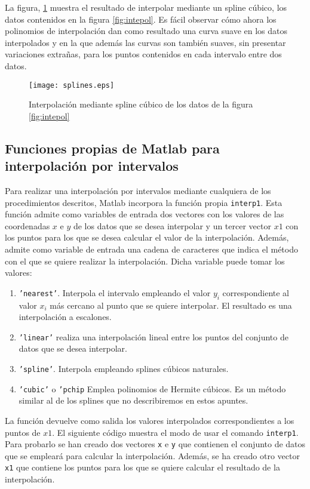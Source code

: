  La figura, \ref{fig:splines} muestra el resultado de interpolar mediante un spline cúbico, los datos contenidos en la figura \ref{fig:intepol}. Es fácil observar cómo ahora los polinomios de interpolación dan como resultado una curva suave en los datos interpolados y en la que además las curvas son también suaves, sin presentar variaciones extrañas, para los puntos contenidos en cada intervalo entre dos datos.
 
\begin{figure}[h]
\centering
\texttt{[image: splines.eps]}
\caption{Interpolación mediante spline cúbico de los datos de la figura \ref{fig:intepol}} 
\label{fig:splines}
\end{figure} 
 
 
\subsection{Funciones propias de Matlab para interpolación por intervalos} 

Para realizar una interpolación por intervalos mediante cualquiera de los procedimientos descritos, Matlab incorpora la función propia \texttt{interp1}. Esta función admite como variables de entrada dos vectores con los valores de las coordenadas $x$ e $y$ de los datos que se desea interpolar y un tercer vector $x1$ con los puntos para los que se desea calcular el valor de la interpolación. Además, admite como variable  de entrada una cadena de caracteres que indica el método con el que se quiere realizar la interpolación. Dicha variable puede tomar los valores:
\begin{enumerate}
\item \texttt{'nearest'}. Interpola el intervalo empleando el valor $y_i$ correspondiente al valor  $x_i$ más cercano al punto que se quiere interpolar. El resultado es una interpolación a escalones.
\item \texttt{'linear'} realiza una interpolación lineal entre los puntos del conjunto de datos que se desea interpolar.
\item \texttt{'spline'}. Interpola empleando splines cúbicos naturales.
\item \texttt{'cubic'} o \texttt{'pchip} Emplea polinomios de Hermite cúbicos. Es un método similar al de los splines que no describiremos en estos apuntes.
\end{enumerate} 

La función devuelve como salida los valores interpolados correspondientes a los puntos de $x1$. El siguiente código muestra el modo de usar el comando \texttt{interp1}. Para probarlo se han creado dos vectores \texttt{x} e \texttt{y} que contienen el conjunto de datos que se empleará para calcular la interpolación. Además, se ha creado otro vector \texttt{x1} que contiene los puntos para los que se quiere calcular el resultado de la interpolación.

